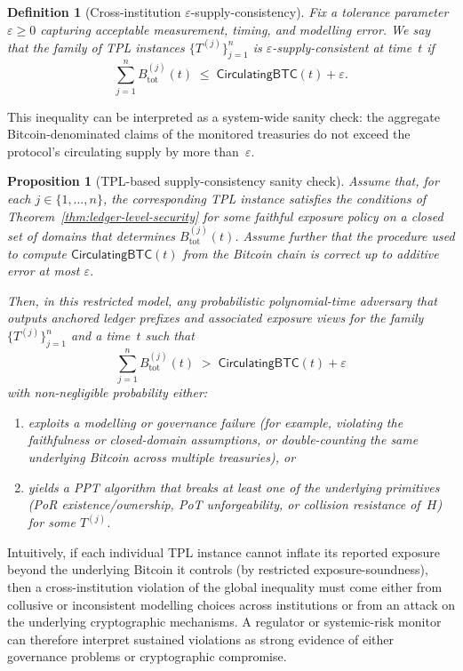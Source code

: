 \documentclass[11pt]{article}
\newtheorem{definition}{Definition}
\newtheorem{proposition}{Proposition}
\begin{document}
\begin{definition}[Cross-institution $\varepsilon$-supply-consistency]
\label{def:cross-supply-consistency}
Fix a tolerance parameter $\varepsilon \geq 0$ capturing acceptable measurement, timing, and modelling error.
We say that the family of TPL instances $\{T^{(j)}\}_{j=1}^n$ is \emph{$\varepsilon$-supply-consistent at time~$t$} if
\[
  \sum_{j=1}^n B_{\mathrm{tot}}^{(j)}(t)
  \;\leq\;
  \mathsf{CirculatingBTC}(t) + \varepsilon.
\]
\end{definition}

This inequality can be interpreted as a system-wide sanity check: the aggregate Bitcoin-denominated claims of the monitored
treasuries do not exceed the protocol's circulating supply by more than~$\varepsilon$.

\begin{proposition}[TPL-based supply-consistency sanity check]
\label{prop:supply-consistency}
Assume that, for each $j \in \{1,\dots,n\}$, the corresponding TPL instance satisfies the conditions of
Theorem~\ref{thm:ledger-level-security} for some faithful exposure policy on a closed set of domains that determines
$B_{\mathrm{tot}}^{(j)}(t)$.
Assume further that the procedure used to compute $\mathsf{CirculatingBTC}(t)$ from the Bitcoin chain is correct up to
additive error at most $\varepsilon$.

Then, in this restricted model, any probabilistic polynomial-time adversary that outputs anchored ledger prefixes
and associated exposure views for the family $\{T^{(j)}\}_{j=1}^n$ and a time~$t$ such that
\[
  \sum_{j=1}^n B_{\mathrm{tot}}^{(j)}(t)
  \;>\;
  \mathsf{CirculatingBTC}(t) + \varepsilon
\]
with non-negligible probability either:
\begin{enumerate}[noitemsep]
\item exploits a modelling or governance failure (for example, violating the faithfulness or closed-domain
      assumptions, or double-counting the same underlying Bitcoin across multiple treasuries), or
\item yields a PPT algorithm that breaks at least one of the underlying primitives
      (PoR existence/ownership, PoT unforgeability, or collision resistance of~$H$)
      for some $T^{(j)}$.
\end{enumerate}
\end{proposition}

\noindent
Intuitively, if each individual TPL instance cannot inflate its reported exposure beyond the underlying Bitcoin it
controls (by restricted exposure-soundness), then a cross-institution violation of the global inequality must come
either from collusive or inconsistent modelling choices across institutions or from an attack on the underlying
cryptographic mechanisms.
A regulator or systemic-risk monitor can therefore interpret sustained violations as strong evidence of either
governance problems or cryptographic compromise.
\end{document}
